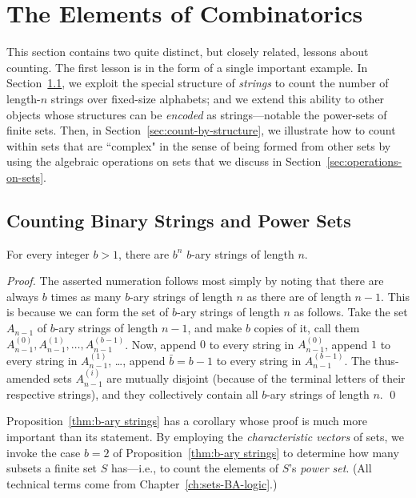 \section{The Elements of Combinatorics}
\label{sec:counting}

This section contains two quite distinct, but closely related, lessons about counting.  The first lesson
is in the form of a single important example.  In Section~\ref{sec:b-ary strings}, we exploit the special
structure of {\em strings} to count the number of length-$n$ strings over fixed-size alphabets; and we 
extend this ability to other objects whose structures can be {\em encoded} as strings---notable the power-sets
of finite sets.  Then, in Section~\ref{sec:count-by-structure}, we illustrate how to count within sets that
are ``complex" in the sense of being formed from other sets by using the algebraic operations on sets that
we discuss in Section~\ref{sec:operations-on-sets}.


\subsection{Counting Binary Strings and Power Sets}
\label{sec:b-ary strings}

\begin{prop}
\label{thm:b-ary strings}
For every integer $b > 1$, there are $b^n$ $b$-ary strings of length $n$.
\end{prop}

\begin{proof}
The asserted numeration follows most simply by noting that there are
always $b$ times as many $b$-ary strings of length $n$ as there are of
length $n-1$.  This is because we can form the set of $b$-ary strings
of length $n$ as follows.  Take the set $A_{n-1}$ of $b$-ary strings
of length $n-1$, and make $b$ copies of it, call them $A^{(0)}_{n-1},
A^{(1)}_{n-1}, \ldots, A^{(b-1)}_{n-1}$.  Now, append $0$ to every
string in $A^{(0)}_{n-1}$, append $1$ to every string in
$A^{(1)}_{n-1}$, \ldots, append $\bar{b} = b-1$ to every string in
$A^{(b-1)}_{n-1}$.  The thus-amended sets $A^{(i)}_{n-1}$ are mutually
disjoint (because of the terminal letters of their respective
strings), and they collectively contain all $b$-ary strings of length
$n$.  \qed
\end{proof}

\medskip

Proposition~\ref{thm:b-ary strings} has a corollary whose proof is much more important than its
statement.   By employing the {\em characteristic vectors} of sets, we invoke the case $b=2$ of 
Proposition~\ref{thm:b-ary strings} to determine how many subsets a finite set $S$ has---i.e., to
count the elements of $S$'s {\em power set}.  (All technical terms
come from Chapter~\ref{ch:sets-BA-logic}.)


